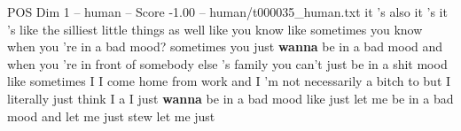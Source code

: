 \begin{textsample}{POS Dim 1 – human – Score -1.00 – human/t000035\_human.txt}  \label{ex:f1_pos_014}
it 's also it 's it 's like the silliest little things as well like you know like sometimes you know when you 're in a bad mood? sometimes you just \textbf{wanna} be in a bad mood and when you 're in front of somebody else 's family you can't just be in a shit mood like sometimes I I come home from work and I 'm not necessarily a bitch to but I literally just think I a I just \textbf{wanna} be in a bad mood like just let me be in a bad mood and let me just stew let me just

\end{textsample}
